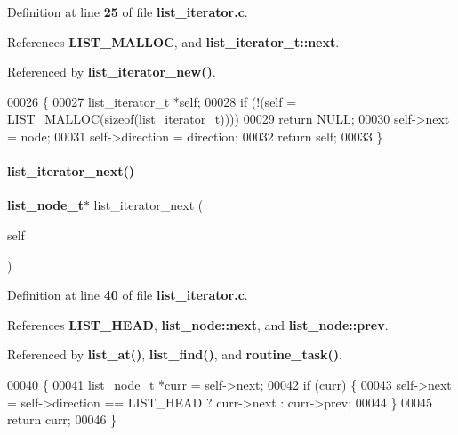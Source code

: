 Definition at line \textbf{ 25} of file \textbf{ list\+\_\+iterator.\+c}.



References \textbf{ L\+I\+S\+T\+\_\+\+M\+A\+L\+L\+OC}, and \textbf{ list\+\_\+iterator\+\_\+t\+::next}.



Referenced by \textbf{ list\+\_\+iterator\+\_\+new()}.


\begin{DoxyCode}
00026                                                                          \{
00027   list_iterator_t *\textcolor{keyword}{self};
00028   \textcolor{keywordflow}{if} (!(\textcolor{keyword}{self} = LIST_MALLOC(\textcolor{keyword}{sizeof}(list_iterator_t))))
00029     \textcolor{keywordflow}{return} NULL;
00030   \textcolor{keyword}{self}->next = node;
00031   \textcolor{keyword}{self}->direction = direction;
00032   \textcolor{keywordflow}{return} \textcolor{keyword}{self};
00033 \}
\end{DoxyCode}
\mbox{\label{a00029_a2e5db981e32d3aef49ea79505a0615a6}} 
\paragraph{list\+\_\+iterator\+\_\+next()}
{\footnotesize\ttfamily \textbf{ list\+\_\+node\+\_\+t}$\ast$ list\+\_\+iterator\+\_\+next (\begin{DoxyParamCaption}\item[{\textbf{ list\+\_\+iterator\+\_\+t} $\ast$}]{self }\end{DoxyParamCaption})}



Definition at line \textbf{ 40} of file \textbf{ list\+\_\+iterator.\+c}.



References \textbf{ L\+I\+S\+T\+\_\+\+H\+E\+AD}, \textbf{ list\+\_\+node\+::next}, and \textbf{ list\+\_\+node\+::prev}.



Referenced by \textbf{ list\+\_\+at()}, \textbf{ list\+\_\+find()}, and \textbf{ routine\+\_\+task()}.


\begin{DoxyCode}
00040                                                        \{
00041   list_node_t *curr = \textcolor{keyword}{self}->next;
00042   \textcolor{keywordflow}{if} (curr) \{
00043     \textcolor{keyword}{self}->next = \textcolor{keyword}{self}->direction == LIST_HEAD ? curr->next : curr->prev;
00044   \}
00045   \textcolor{keywordflow}{return} curr;
00046 \}
\end{DoxyCode}
\mbox{\label{a00029_a97f6f9590b1cdedd5367b9139e9cc4ef}} 
